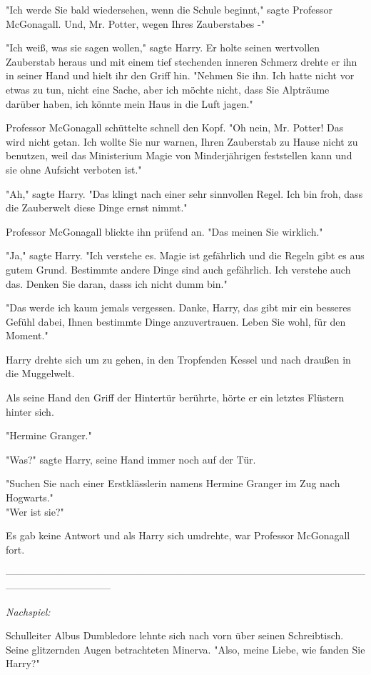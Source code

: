 {"Ich werde Sie bald wiedersehen, wenn die Schule beginnt," sagte Professor McGonagall. Und, Mr. Potter, wegen Ihres Zauberstabes -"

"Ich weiß, was sie sagen wollen," sagte Harry. Er holte seinen wertvollen Zauberstab heraus und mit einem tief stechenden inneren Schmerz drehte er ihn in seiner Hand und hielt ihr den Griff hin. "Nehmen Sie ihn. Ich hatte nicht vor etwas zu tun, nicht eine Sache, aber ich möchte nicht, dass Sie Alpträume darüber haben, ich könnte mein Haus in die Luft jagen."

Professor McGonagall schüttelte schnell den Kopf. "Oh nein, Mr. Potter! Das wird nicht getan. Ich wollte Sie nur warnen, Ihren Zauberstab zu Hause nicht zu benutzen, weil das Ministerium Magie von Minderjährigen feststellen kann und sie ohne Aufsicht verboten ist."

"Ah," sagte Harry. "Das klingt nach einer sehr sinnvollen Regel. Ich bin froh, dass die Zauberwelt diese Dinge ernst nimmt."

Professor McGonagall blickte ihn prüfend an. "Das meinen Sie wirklich."

"Ja," sagte Harry. "Ich verstehe es. Magie ist gefährlich und die Regeln gibt es aus gutem Grund. Bestimmte andere Dinge sind auch gefährlich. Ich verstehe auch das. Denken Sie daran, dasss ich nicht dumm bin."

"Das werde ich kaum jemals vergessen. Danke, Harry, das gibt mir ein besseres Gefühl dabei, Ihnen bestimmte Dinge anzuvertrauen. Leben Sie wohl, für den Moment."

Harry drehte sich um zu gehen, in den Tropfenden Kessel und nach draußen in die Muggelwelt.

Als seine Hand den Griff der Hintertür berührte, hörte er ein letztes Flüstern hinter sich.

"Hermine Granger."

"Was?" sagte Harry, seine Hand immer noch auf der Tür.

"Suchen Sie nach einer Erstklässlerin namens Hermine Granger im Zug nach Hogwarts."\\ "Wer ist sie?"

Es gab keine Antwort und als Harry sich umdrehte, war Professor McGonagall fort.

--------------------------------------------------------------------------------------------------------------------------------------------

\emph{Nachspiel:}

Schulleiter Albus Dumbledore lehnte sich nach vorn über seinen Schreibtisch. Seine glitzernden Augen betrachteten Minerva. "Also, meine Liebe, wie fanden Sie Harry?"

}
